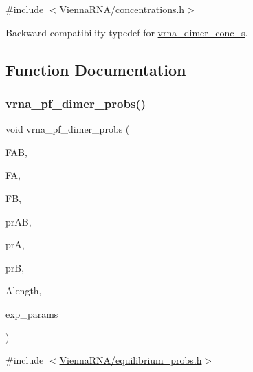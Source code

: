 {\ttfamily \#include $<$\mbox{\hyperlink{concentrations_8h}{Vienna\+R\+N\+A/concentrations.\+h}}$>$}



Backward compatibility typedef for \mbox{\hyperlink{structvrna__dimer__conc__s}{vrna\+\_\+dimer\+\_\+conc\+\_\+s}}. 



\subsection{Function Documentation}
\mbox{\label{group__pf__cofold_gaa1e39e73afb51fbaf4ae38f0c066c46b}} 
\subsubsection{\texorpdfstring{vrna\+\_\+pf\+\_\+dimer\+\_\+probs()}{vrna\_pf\_dimer\_probs()}}
{\footnotesize\ttfamily void vrna\+\_\+pf\+\_\+dimer\+\_\+probs (\begin{DoxyParamCaption}\item[{double}]{F\+AB,  }\item[{double}]{FA,  }\item[{double}]{FB,  }\item[{\mbox{\hyperlink{group__struct__utils_gab9ac98ab55ded9fb90043b024b915aca}{vrna\+\_\+ep\+\_\+t}} $\ast$}]{pr\+AB,  }\item[{const \mbox{\hyperlink{group__struct__utils_gab9ac98ab55ded9fb90043b024b915aca}{vrna\+\_\+ep\+\_\+t}} $\ast$}]{prA,  }\item[{const \mbox{\hyperlink{group__struct__utils_gab9ac98ab55ded9fb90043b024b915aca}{vrna\+\_\+ep\+\_\+t}} $\ast$}]{prB,  }\item[{int}]{Alength,  }\item[{const \mbox{\hyperlink{group__energy__parameters_ga01d8b92fe734df8d79a6169482c7d8d8}{vrna\+\_\+exp\+\_\+param\+\_\+t}} $\ast$}]{exp\+\_\+params }\end{DoxyParamCaption})}



{\ttfamily \#include $<$\mbox{\hyperlink{equilibrium__probs_8h}{Vienna\+R\+N\+A/equilibrium\+\_\+probs.\+h}}$>$}



